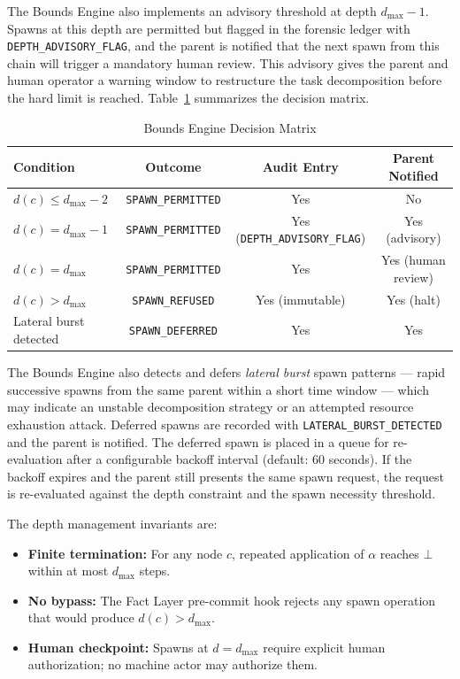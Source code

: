 The Bounds Engine also implements an advisory threshold at depth $d_{\max} - 1$. Spawns at this depth are permitted but flagged in the forensic ledger with \texttt{DEPTH\_ADVISORY\_FLAG}, and the parent is notified that the next spawn from this chain will trigger a mandatory human review. This advisory gives the parent and human operator a warning window to restructure the task decomposition before the hard limit is reached. Table~\ref{tab:bounds-decision} summarizes the decision matrix.

\begin{table}[h]
\centering
\caption{Bounds Engine Decision Matrix}
\label{tab:bounds-decision}
\begin{tabular}{|l|c|c|c|}
\hline
\textbf{Condition} & \textbf{Outcome} & \textbf{Audit Entry} & \textbf{Parent Notified} \\
\hline
$d(c) \leq d_{\max} - 2$ & \texttt{SPAWN\_PERMITTED} & Yes & No \\
$d(c) = d_{\max} - 1$ & \texttt{SPAWN\_PERMITTED} & Yes (\texttt{DEPTH\_ADVISORY\_FLAG}) & Yes (advisory) \\
$d(c) = d_{\max}$ & \texttt{SPAWN\_PERMITTED} & Yes & Yes (human review) \\
$d(c) > d_{\max}$ & \texttt{SPAWN\_REFUSED} & Yes (immutable) & Yes (halt) \\
Lateral burst detected & \texttt{SPAWN\_DEFERRED} & Yes & Yes \\
\hline
\end{tabular}
\end{table}

The Bounds Engine also detects and defers \textit{lateral burst} spawn patterns — rapid successive spawns from the same parent within a short time window — which may indicate an unstable decomposition strategy or an attempted resource exhaustion attack. Deferred spawns are recorded with \texttt{LATERAL\_BURST\_DETECTED} and the parent is notified. The deferred spawn is placed in a queue for re-evaluation after a configurable backoff interval (default: 60 seconds). If the backoff expires and the parent still presents the same spawn request, the request is re-evaluated against the depth constraint and the spawn necessity threshold.

The depth management invariants are:

\begin{itemize}
    \itemsep0em
    \item \textbf{Finite termination:} For any node $c$, repeated application of $\alpha$ reaches $\bot$ within at most $d_{\max}$ steps.
    \item \textbf{No bypass:} The Fact Layer pre-commit hook rejects any spawn operation that would produce $d(c) > d_{\max}$.
    \item \textbf{Human checkpoint:} Spawns at $d = d_{\max}$ require explicit human authorization; no machine actor may authorize them.
\end{itemize}

